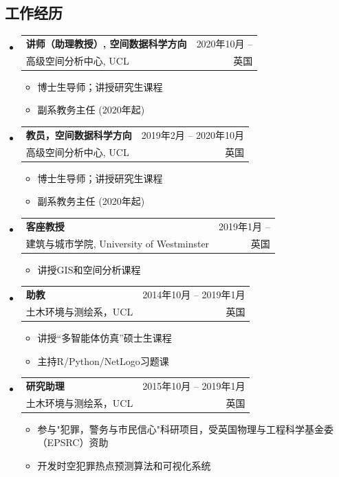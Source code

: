 \documentclass[A4,11pt]{article}
\makeatletter
\newcommand{\CVItem}[1]{
  \item\small{
    {#1 \vspace{-2pt}}
  }
}
\newcommand{\CVSubheading}[4]{
  \vspace{-2pt}\item
    \begin{tabular*}{0.97\textwidth}[t]{l@{\extracolsep{\fill}}r}
      \textbf{#1} & #2 \\
      \small#3 & \small #4 \\
    \end{tabular*}\vspace{-7pt}
}
\newcommand{\CVSubHeadingListStart}{\begin{itemize}[leftmargin=0.5cm, label={}]}
\newcommand{\CVSubHeadingListEnd}{\end{itemize}}
\newcommand{\CVItemListStart}{\begin{itemize}}
\newcommand{\CVItemListEnd}{\end{itemize}\vspace{-5pt}}
\makeatother
\begin{document}
\begin{CJK*}{UTF8}{gbsn}

\section{工作经历}
  \CVSubHeadingListStart
    \CVSubheading
      {\textbf{讲师（助理教授）}, 空间数据科学方向}{2020年10月 --}
      {高级空间分析中心, UCL}{英国}
      \CVItemListStart
        \CVItem{博士生导师；讲授研究生课程}        
        \CVItem{副系教务主任 (2020年起)}
      \CVItemListEnd
    \CVSubheading
    {教员，空间数据科学方向}{2019年2月 -- 2020年10月}
      {高级空间分析中心, UCL}{英国}
      \CVItemListStart
        \CVItem{博士生导师；讲授研究生课程}        
        \CVItem{副系教务主任 (2020年起)}
      \CVItemListEnd
    \CVSubheading
      {客座教授}{2019年1月 --}
      {建筑与城市学院, University of Westminster}{英国}
      \CVItemListStart
        \CVItem{讲授GIS和空间分析课程}
    \CVItemListEnd
    \CVSubheading
      {助教}{2014年10月 -- 2019年1月}
      {土木环境与测绘系，UCL}{英国}
      \CVItemListStart
        \CVItem{讲授“多智能体仿真”硕士生课程}
        \CVItem{主持R/Python/NetLogo习题课}
      \CVItemListEnd
     \CVSubheading
      {研究助理}{2015年10月 -- 2019年1月}
      {土木环境与测绘系，UCL}{英国}
      \CVItemListStart
        \CVItem{参与"犯罪，警务与市民信心"科研项目，受英国物理与工程科学基金委（EPSRC）资助}
        \CVItem{开发时空犯罪热点预测算法和可视化系统}
      \CVItemListEnd
  \CVSubHeadingListEnd

\end{CJK*}
\end{document}
